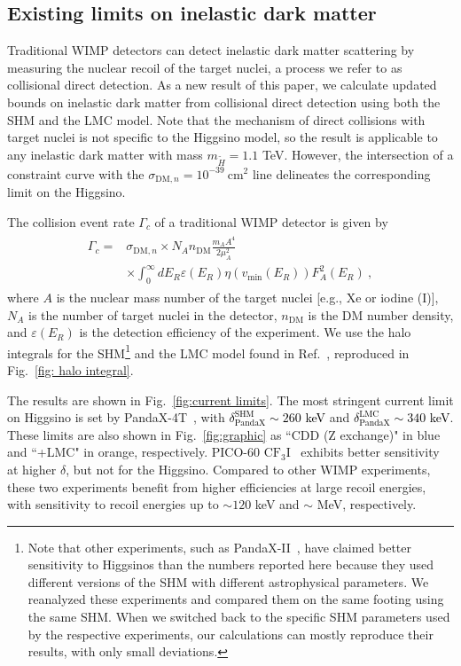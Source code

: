\documentclass[aps,prd,amsmath,amssymb,10pt,letterpaper,balancelastpage,showpacs,superscriptaddress,nofootinbib,floatfix,notitlepage,longbibliography,twocolumn
]{revtex4-2}
\newcommand{\numcolor}[1]{\textcolor{black}{#1}}
\newcommand{\vmin}{v_{\text{min}}}
\newcommand{\mx}{m_{\Ht}}
\newcommand{\muA}{\mu_A}
\newcommand{\Ht}{\tilde{H}}
\begin{document}
\subsection{Existing limits on inelastic dark matter}
Traditional WIMP detectors can detect inelastic dark matter scattering by measuring the nuclear recoil of the target nuclei, a process we refer to as collisional direct detection. As a new result of this paper, we calculate updated bounds on inelastic dark matter from collisional direct detection using both the SHM and the LMC model. Note that the mechanism of direct collisions with target nuclei is not specific to the Higgsino model, so the result is applicable to any inelastic dark matter with mass $\mx = 1.1$ TeV. However, the intersection of a constraint curve with the $\sigma_{\text{DM}, n}=10^{-39}~\text{cm}^2$ line delineates the corresponding limit on the Higgsino.

The collision event rate $\Gamma_{c}$ of a traditional WIMP detector is given by
\begin{align}
\begin{split}
    \Gamma_c =& \sigma_{\text{DM}, n} \times N_A n_{\text{DM}} \frac{m_A A^4 }{2\muA^2} \\
    &\times\int_{0}^{\infty} dE_R  \varepsilon(E_R) \eta(\vmin(E_R)) F_A^2(E_R) ~,
\end{split}
\end{align}
where $A$ is the nuclear mass number of the target nuclei [e.g., Xe or iodine (I)], $N_A$ is the number of target nuclei in the detector, $n_{\text{DM}}$ is the DM number density, and $\varepsilon(E_R)$ is the detection efficiency of the experiment. We use the halo integrals for the SHM\footnote{Note that other experiments, such as PandaX-II~\cite{PandaXII2022}, have claimed better sensitivity to Higgsinos than the numbers reported here because they used different versions of the SHM with different astrophysical parameters. We reanalyzed these experiments and compared them on the same footing using the same SHM. When we switched back to the specific SHM parameters used by the respective experiments, our calculations can mostly reproduce their results, with only small deviations.} and the LMC model found in Ref.~\cite{LMC}, reproduced in Fig.~\ref{fig: halo integral}.

The results are shown in Fig.~\ref{fig:current limits}. The most stringent current limit on Higgsino is set by PandaX-4T~\cite{PandaX4T2021}, with \numcolor{$\delta^{\text{SHM}}_{\text{PandaX}} \sim 260$ keV} and \numcolor{$\delta^{\text{LMC}}_{\text{PandaX}} \sim 340$ keV}. These limits are also shown in Fig.~\ref{fig:graphic} as ``CDD (Z exchange)" in blue and ``+LMC" in orange, respectively. PICO-60 $\text{CF}_3\text{I}$~\cite{PICO2023} exhibits better sensitivity at higher $\delta$, but not for the Higgsino. Compared to other WIMP experiments, these two experiments benefit from higher efficiencies at large recoil energies, with sensitivity to recoil energies up to $\sim 120$ keV and $\sim $ MeV, respectively.
\end{document}
